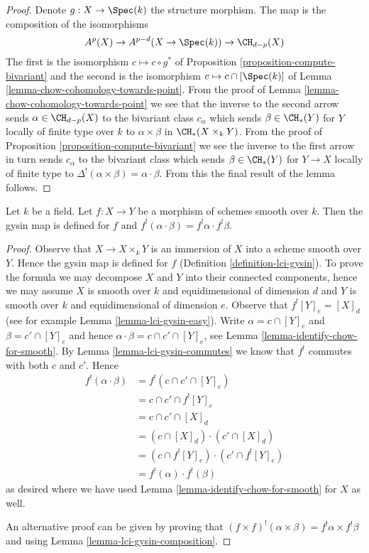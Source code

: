 \begin{proof}
Denote $g : X \to \Spec(k)$ the structure morphism.
The map is the composition of the isomorphisms
$$
A^p(X) \to A^{p - d}(X \to \Spec(k)) \to \CH_{d - p}(X)
$$
The first is the isomorphism $c \mapsto c \circ g^*$ of
Proposition \ref{proposition-compute-bivariant}
and the second is the isomorphism $c \mapsto c \cap [\Spec(k)]$ of
Lemma \ref{lemma-chow-cohomology-towards-point}.
From the proof of Lemma \ref{lemma-chow-cohomology-towards-point}
we see that the inverse to the second arrow sends $\alpha \in \CH_{d - p}(X)$
to the bivariant class $c_\alpha$ which sends $\beta \in \CH_*(Y)$
for $Y$ locally of finite type over $k$
to $\alpha \times \beta$ in $\CH_*(X \times_k Y)$. From the proof of
Proposition \ref{proposition-compute-bivariant} we see the inverse
to the first arrow in turn sends $c_\alpha$ to the bivariant class
which sends $\beta \in \CH_*(Y)$ for $Y \to X$ locally of finite type
to $\Delta^!(\alpha \times \beta) = \alpha \cdot \beta$.
From this the final result of the lemma follows.
\end{proof}

\begin{lemma}
\label{lemma-lci-gysin-product}
Let $k$ be a field. Let $f : X \to Y$ be a morphism of schemes smooth
over $k$. Then the gysin map is defined for $f$ and
$f^!(\alpha \cdot \beta) = f^!\alpha \cdot f^!\beta$.
\end{lemma}

\begin{proof}
Observe that $X \to X \times_k Y$ is an immersion of $X$ into a scheme
smooth over $Y$. Hence the gysin map is defined for $f$
(Definition \ref{definition-lci-gysin}).
To prove the formula we may decompose $X$ and $Y$ into their
connected components, hence we may assume $X$ is smooth over $k$
and equidimensional of dimension $d$ and $Y$ is smooth over $k$
and equidimensional of dimension $e$. Observe that
$f^![Y]_e = [X]_d$ (see for example Lemma \ref{lemma-lci-gysin-easy}).
Write $\alpha = c \cap [Y]_e$ and $\beta = c' \cap [Y]_e$
and hence $\alpha \cdot \beta = c \cap c' \cap [Y]_e$,
see Lemma \ref{lemma-identify-chow-for-smooth}.
By Lemma \ref{lemma-lci-gysin-commutes} we know that $f^!$
commutes with both $c$ and $c'$. Hence
\begin{align*}
f^!(\alpha \cdot \beta)
& =
f^!(c \cap c' \cap [Y]_e) \\
& =
c \cap c' \cap f^![Y]_e \\
& =
c \cap c' \cap [X]_d \\
& =
(c \cap [X]_d) \cdot (c' \cap [X]_d) \\
& =
(c \cap f^![Y]_e) \cdot (c' \cap f^![Y]_e) \\
& =
f^!(\alpha) \cdot f^!(\beta)
\end{align*}
as desired where we have used Lemma \ref{lemma-identify-chow-for-smooth}
for $X$ as well.

\medskip\noindent
An alternative proof can be given by proving that
$(f \times f)^!(\alpha \times \beta) = f^!\alpha \times f^!\beta$
and using Lemma \ref{lemma-lci-gysin-composition}.
\end{proof}

